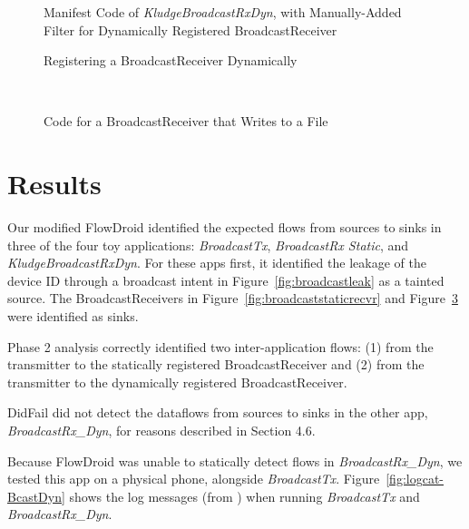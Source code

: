 \begin{figure}[!h]
\begin{framed}

\caption{Manifest Code of \emph{KludgeBroadcastRxDyn}, with Manually-Added Filter for Dynamically Registered BroadcastReceiver}
\label{fig:broadcastDynManifestKludge}
\end{framed}
\end{figure}

\begin{figure}[!h]
\begin{framed}

\caption{Registering a BroadcastReceiver Dynamically}
\label{fig:broadcastregister}
\end{framed}
\end{figure}

\
\begin{figure}[!h]
\begin{framed}

\caption{Code for a BroadcastReceiver that Writes to a File}
\label{fig:broadcastdynrecvr}
\end{framed}
\end{figure}

\section{Results}

Our modified FlowDroid identified the expected flows from sources to sinks in three of the four toy applications: \textit{BroadcastTx}, \textit{BroadcastRx Static}, and \textit{KludgeBroadcastRxDyn}. For these apps first, it identified the leakage of the device ID through a broadcast intent in Figure~\ref{fig:broadcastleak} as a tainted source. The BroadcastReceivers in Figure~\ref{fig:broadcaststaticrecvr} and Figure~\ref{fig:broadcastdynrecvr} were identified as sinks.

Phase 2 analysis correctly identified two inter-application flows: (1) from the transmitter to the statically registered BroadcastReceiver and (2) from the transmitter to the dynamically registered BroadcastReceiver.

DidFail did not detect the dataflows from sources to sinks in the other app, \textit{BroadcastRx\_Dyn}, for reasons described in Section 4.6.

Because FlowDroid was unable to statically detect flows in \textit{BroadcastRx\_Dyn}, we tested this app on a physical phone, alongside \textit{BroadcastTx}. Figure~\ref{fig:logcat-BcastDyn} shows the log messages (from ) when running \textit{BroadcastTx} and \textit{BroadcastRx\_Dyn}.

